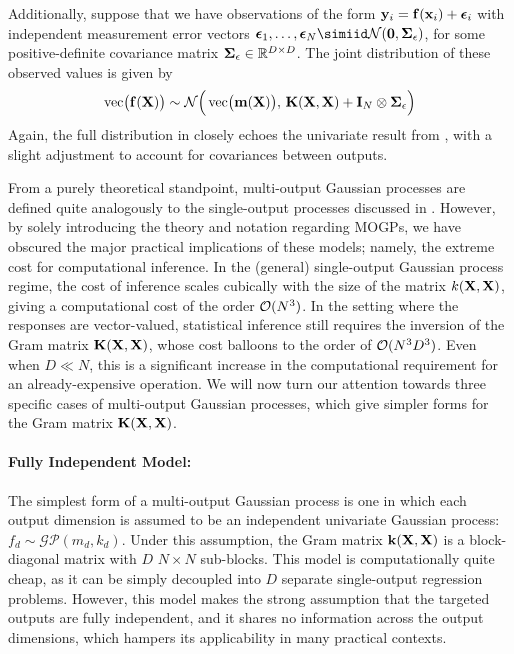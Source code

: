\documentclass[10pt]{article}
\numberwithin{equation}{section}
\newcommand{\calGP}{\mathcal{GP}}
\DeclareMathOperator{\vect}{vec}
\begin{document}
Additionally, suppose that we have observations of the form $\mathbf{y}_{i} = \mathbf{f}(\mathbf{x}_{i}) + \bm{\epsilon}_{i}$ with independent measurement error vectors $\bfepsilon_{1}, \dots, \bfepsilon_{N} \simiid \calN(\mathbf{0}, \bfSigma_{\epsilon})$, for some positive-definite covariance matrix $\bm{\Sigma}_{\epsilon} \in \mathbb{R}^{D \times D}$. The joint distribution of these observed values is given by
\begin{equation}
\label{eq:MOGP-obs-distribution}
    \vect\!\big(\bff(\bfX)\big) \sim \calN\Big(\vect\!\big(\bfm(\bfX)\big),\, \bfK(\bfX, \bfX) + \bfI_{N} \otimes \bfSigma_{\epsilon}\Big)
\end{equation}
Again, the full distribution in  closely echoes the univariate result from , with a slight adjustment to account for covariances between outputs.

From a purely theoretical standpoint, multi-output Gaussian processes are defined quite analogously to the single-output processes discussed in . However, by solely introducing the theory and notation regarding MOGPs, we have obscured the major practical implications of these models; namely, the extreme cost for computational inference. In the (general) single-output Gaussian process regime, the cost of inference scales cubically with the size of the matrix $k(\mathbf{X}, \mathbf{X})$, giving a computational cost of the order $\mathcal{O}(N^{3})$. In the setting where the responses are vector-valued, statistical inference still requires the inversion of the Gram matrix $\mathbf{K}(\mathbf{X}, \mathbf{X})$, whose cost balloons to the order of $\mathcal{O}(N^{3}D^{3})$. Even when $D \ll N$, this is a significant increase in the computational requirement for an already-expensive operation. We will now turn our attention towards three specific cases of multi-output Gaussian processes, which give simpler forms for the Gram matrix $\mathbf{K}(\mathbf{X}, \mathbf{X})$.

\paragraph{Fully Independent Model:} The simplest form of a multi-output Gaussian process is one in which each output dimension is assumed to be an independent univariate Gaussian process: $f_{d} \sim \calGP(m_{d}, k_{d})$. Under this assumption, the Gram matrix $\mathbf{k}(\mathbf{X}, \mathbf{X})$ is a block-diagonal matrix with $D$ $N \times N$ sub-blocks. This model is computationally quite cheap, as it can be simply decoupled into $D$ separate single-output regression problems. However, this model makes the strong assumption that the targeted outputs are fully independent, and it shares no information across the output dimensions, which hampers its applicability in many practical contexts.
\end{document}
